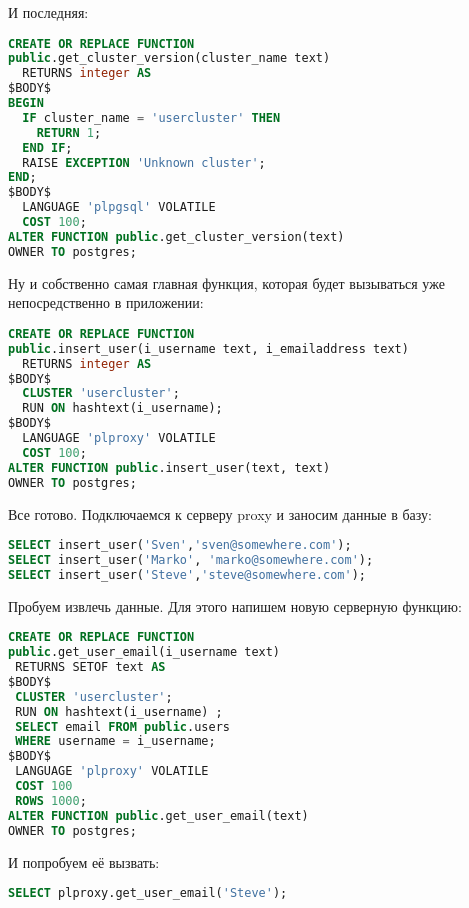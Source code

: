 И последняя:

\begin{lstlisting}[language=SQL,label=lst:plproxy9,caption=Настройка]
CREATE OR REPLACE FUNCTION
public.get_cluster_version(cluster_name text)
  RETURNS integer AS
$BODY$
BEGIN
  IF cluster_name = 'usercluster' THEN
    RETURN 1;
  END IF;
  RAISE EXCEPTION 'Unknown cluster';
END;
$BODY$
  LANGUAGE 'plpgsql' VOLATILE
  COST 100;
ALTER FUNCTION public.get_cluster_version(text)
OWNER TO postgres;
\end{lstlisting}

Ну и собственно самая главная функция, которая будет вызываться уже непосредственно в приложении:

\begin{lstlisting}[language=SQL,label=lst:plproxy10,caption=Настройка]
CREATE OR REPLACE FUNCTION
public.insert_user(i_username text, i_emailaddress text)
  RETURNS integer AS
$BODY$
  CLUSTER 'usercluster';
  RUN ON hashtext(i_username);
$BODY$
  LANGUAGE 'plproxy' VOLATILE
  COST 100;
ALTER FUNCTION public.insert_user(text, text)
OWNER TO postgres;
\end{lstlisting}

Все готово. Подключаемся к серверу proxy и заносим данные в базу:

\begin{lstlisting}[language=SQL,label=lst:plproxy11,caption=Настройка]
SELECT insert_user('Sven','sven@somewhere.com');
SELECT insert_user('Marko', 'marko@somewhere.com');
SELECT insert_user('Steve','steve@somewhere.com');
\end{lstlisting}

Пробуем извлечь данные. Для этого напишем новую серверную функцию:

\begin{lstlisting}[language=SQL,label=lst:plproxy12,caption=Настройка]
CREATE OR REPLACE FUNCTION
public.get_user_email(i_username text)
 RETURNS SETOF text AS
$BODY$
 CLUSTER 'usercluster';
 RUN ON hashtext(i_username) ;
 SELECT email FROM public.users
 WHERE username = i_username;
$BODY$
 LANGUAGE 'plproxy' VOLATILE
 COST 100
 ROWS 1000;
ALTER FUNCTION public.get_user_email(text)
OWNER TO postgres;
\end{lstlisting}

И попробуем её вызвать:

\begin{lstlisting}[language=SQL,label=lst:plproxy13,caption=Настройка]
SELECT plproxy.get_user_email('Steve');
\end{lstlisting}

